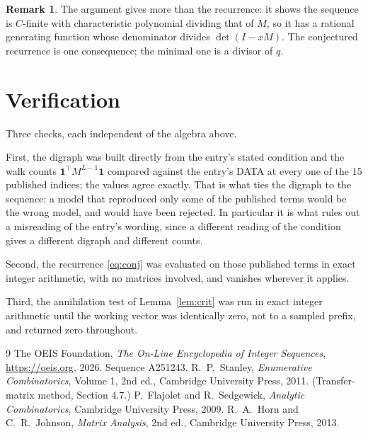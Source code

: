 \documentclass[11pt,a4paper]{article}
\theoremstyle{plain}
\theoremstyle{definition}
\newtheorem{remark}[theorem]{Remark}
\begin{document}
\begin{remark}
The argument gives more than the recurrence: it shows the sequence is $C$-finite with
characteristic polynomial dividing that of $M$, so it has a rational generating function
whose denominator divides $\det(I-xM)$. The conjectured recurrence is one consequence; the
minimal one is a divisor of $q$.
\end{remark}

\section{Verification}

Three checks, each independent of the algebra above.

First, the digraph was built directly from the entry's stated condition and the walk counts
$\mathbf{1}^{\!\top}M^{L-1}\mathbf{1}$ compared against the entry's DATA at
every one of the $15$ published indices; the values agree exactly. That is what ties
the digraph to the sequence: a model that reproduced only some of the published terms would
be the wrong model, and would have been rejected. In particular it is what rules out a
misreading of the entry's wording, since a different reading of the condition gives a
different digraph and different counts.

Second, the recurrence \eqref{eq:conj} was evaluated on those published terms in exact
integer arithmetic, with no matrices involved, and vanishes wherever it applies.

Third, the annihilation test of Lemma~\ref{lem:crit} was run in exact integer arithmetic
until the working vector was identically zero, not to a sampled prefix, and returned zero
throughout.

\begin{thebibliography}{9}
 The OEIS Foundation, \emph{The On-Line Encyclopedia of Integer
Sequences}, \url{https://oeis.org}, 2026. Sequence A251243.
 R.~P.~Stanley, \emph{Enumerative Combinatorics}, Volume 1, 2nd ed.,
Cambridge University Press, 2011. (Transfer-matrix method, Section 4.7.)
 P.~Flajolet and R.~Sedgewick, \emph{Analytic Combinatorics}, Cambridge
University Press, 2009.
 R.~A.~Horn and C.~R.~Johnson, \emph{Matrix Analysis}, 2nd ed., Cambridge
University Press, 2013.
\end{thebibliography}
\end{document}
